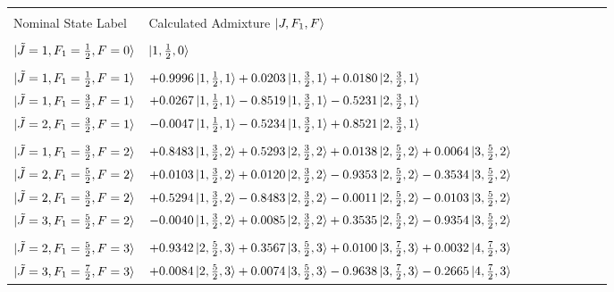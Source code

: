 \documentclass[8pt]{article}
\begin{document}
\begin{table}[]
	\begin{tabular}{l l c c c c c c r}
		\hline
		\hline
		\\
		Nominal State Label & Calculated Admixture $\ket{J, F_1, F}$  \\
		\hline
		\\
		$\ket{\tilde{J}  = 1, F_1 = \frac{1}{2}, F = 0}$ & $\ket{1,\frac{1}{2},0}$ \\ 
		\\
		$\ket{\tilde{J}  = 1, F_1 = \frac{1}{2}, F = 1}$ & $+0.9996\ket{1,\frac{1}{2},1} + 0.0203\ket{1,\frac{3}{2},1} +0.0180\ket{2,\frac{3}{2},1}$ \\
		$\ket{\tilde{J}  = 1, F_1 = \frac{3}{2}, F = 1}$ & $+0.0267\ket{1,\frac{1}{2},1} - 0.8519\ket{1,\frac{3}{2},1} -0.5231\ket{2,\frac{3}{2},1}$  \\
		$\ket{\tilde{J}  = 2, F_1 = \frac{3}{2}, F = 1}$ & $-0.0047\ket{1,\frac{1}{2},1} - 0.5234\ket{1,\frac{3}{2},1} +0.8521\ket{2,\frac{3}{2},1}$   \\
		\\
		$\ket{\tilde{J}  = 1, F_1 = \frac{3}{2}, F = 2}$ & $+0.8483\ket{1,\frac{3}{2},2} + 0.5293\ket{2,\frac{3}{2},2} +0.0138\ket{2,\frac{5}{2},2} +0.0064\ket{3,\frac{5}{2},2}$   \\
		
		$\ket{\tilde{J}  = 2, F_1 = \frac{5}{2}, F = 2}$ & $+0.0103\ket{1,\frac{3}{2},2} + 0.0120\ket{2,\frac{3}{2},2} -0.9353\ket{2,\frac{5}{2},2} -0.3534\ket{3,\frac{5}{2},2}$   \\
		
		$\ket{\tilde{J}  = 2, F_1 = \frac{3}{2}, F = 2}$ & $+0.5294\ket{1,\frac{3}{2},2} - 0.8483\ket{2,\frac{3}{2},2} -0.0011\ket{2,\frac{5}{2},2} -0.0103\ket{3,\frac{5}{2},2}$   \\
		
		$\ket{\tilde{J}  = 3, F_1 = \frac{5}{2}, F = 2}$ & $-0.0040\ket{1,\frac{3}{2},2} + 0.0085\ket{2,\frac{3}{2},2} +0.3535\ket{2,\frac{5}{2},2} -0.9354\ket{3,\frac{5}{2},2}$   \\
		\\
		
		$\ket{\tilde{J}  = 2, F_1 = \frac{5}{2}, F = 3}$ & $+0.9342\ket{2,\frac{5}{2},3} + 0.3567\ket{3,\frac{5}{2},3} +0.0100\ket{3,\frac{7}{2},3} +0.0032\ket{4,\frac{7}{2},3}$   \\
		
		$\ket{\tilde{J}  = 3, F_1 = \frac{7}{2}, F = 3}$ & $+0.0084\ket{2,\frac{5}{2},3} + 0.0074\ket{3,\frac{5}{2},3} -0.9638\ket{3,\frac{7}{2},3} -0.2665\ket{4,\frac{7}{2},3}$   \\
		

\end{tabular}
\end{table}
\end{document}
